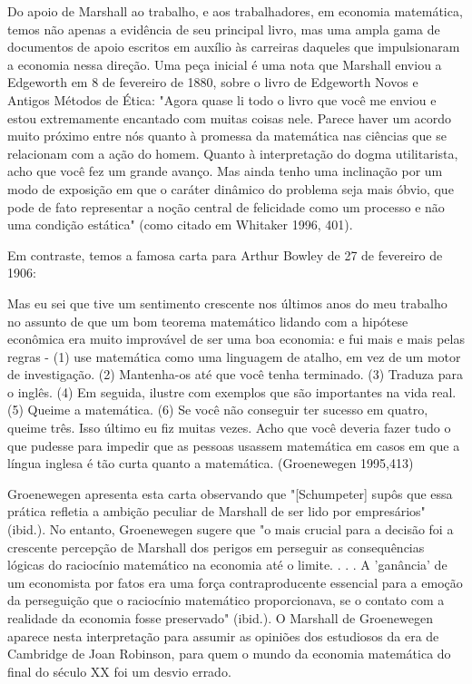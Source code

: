 \documentclass[12pt]{article}
\begin{document}
Do apoio de Marshall ao trabalho, e aos trabalhadores, em economia matemática, temos não apenas a evidência de seu principal livro, mas uma ampla gama de documentos de apoio escritos em auxílio às carreiras daqueles que impulsionaram a economia nessa direção. Uma peça inicial é uma nota que Marshall enviou a Edgeworth em 8 de fevereiro de 1880, sobre o livro de Edgeworth Novos e Antigos Métodos de Ética: "Agora quase li todo o livro que você me enviou e estou extremamente encantado com muitas coisas nele. Parece haver um acordo muito próximo entre nós quanto à promessa da matemática nas ciências que se relacionam com a ação do homem. Quanto à interpretação do dogma utilitarista, acho que você fez um grande avanço. Mas ainda tenho uma inclinação por um modo de exposição em que o caráter dinâmico do problema seja mais óbvio, que pode de fato representar a noção central de felicidade como um processo e não uma condição estática" (como citado em Whitaker 1996, 401).

Em contraste, temos a famosa carta para Arthur Bowley de 27 de fevereiro de 1906:

Mas eu sei que tive um sentimento crescente nos últimos anos do meu trabalho no assunto de que um bom teorema matemático lidando com a hipótese econômica era muito improvável de ser uma boa economia: e fui mais e mais pelas regras - (1) use matemática como uma linguagem de atalho, em vez de um motor de investigação. (2) Mantenha-os até que você tenha terminado. (3) Traduza para o inglês. (4) Em seguida, ilustre com exemplos que são importantes na vida real. (5) Queime a matemática. (6) Se você não conseguir ter sucesso em quatro, queime três. Isso último eu fiz muitas vezes. Acho que você deveria fazer tudo o que pudesse para impedir que as pessoas usassem matemática em casos em que a língua inglesa é tão curta quanto a matemática. (Groenewegen 1995,413)

Groenewegen apresenta esta carta observando que "[Schumpeter] supôs que essa prática refletia a ambição peculiar de Marshall de ser lido por empresários" (ibid.). No entanto, Groenewegen sugere que "o mais crucial para a decisão foi a crescente percepção de Marshall dos perigos em perseguir as consequências lógicas do raciocínio matemático na economia até o limite. . . . A 'ganância' de um economista por fatos era uma força contraproducente essencial para a emoção da perseguição que o raciocínio matemático proporcionava, se o contato com a realidade da economia fosse preservado" (ibid.). O Marshall de Groenewegen aparece nesta interpretação para assumir as opiniões dos estudiosos da era de Cambridge de Joan Robinson, para quem o mundo da economia matemática do final do século XX foi um desvio errado.
\end{document}
